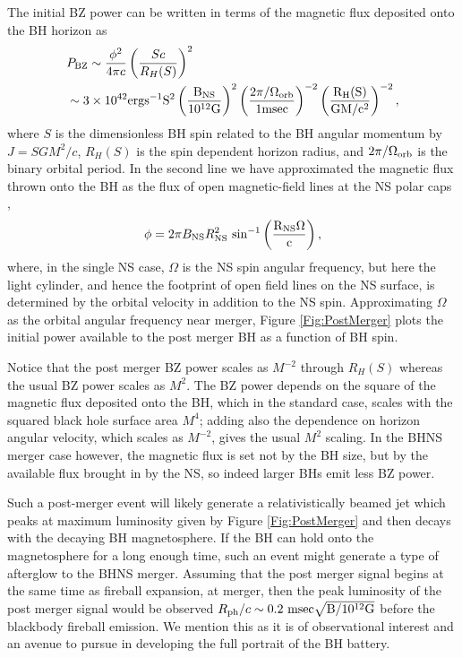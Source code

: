 The initial BZ power can be written in terms of the magnetic flux
deposited onto the BH horizon as
\begin{align}
  \label{Eq:PBZ}
&P_{\rm{BZ}} \sim \frac{\phi^2}{4 \pi c} \left(\frac{S
    c}{R_{H}(S)}\right)^2 \\ \nonumber 
%
&\sim 3 \times 10^{42}
  \rm{erg} \rm{s}^{-1} S^2 \left( \frac{B_{\rm{NS}} }{ 10^{12}
    G}\right)^2 \left( \frac{2 \pi / \Omega_{\rm{orb}} }{ 1 \rm{msec}}\right)^{-2}
  \left( \frac{R_H(S) }{ GM/c^2 }\right)^{-2} ,
\end{align}
where $S$ is the dimensionless BH spin related to the BH angular
momentum by $J = S GM^2/c$, $R_H(S)$ is the spin dependent horizon
radius, and $2 \pi / \Omega_{\rm{orb}}$ is the binary orbital period. In the second line we have approximated the magnetic flux
thrown onto the BH as the flux of open magnetic-field lines at the NS
polar caps \citep{GJ:1969, LyutikovMckinney:2011},
\begin{equation}
\phi = 2 \pi  B_{\rm NS} R^2_{\rm{NS}} \ \rm{sin}^{-1}\left(\frac{ R_{\rm{NS}} \Omega}{c}\right),
\end{equation}
where, in the single NS case, $\Omega$ is the NS spin angular
frequency, but here the light cylinder, and hence the footprint of
open field lines on the NS surface, is determined by the orbital
velocity in addition to the NS spin. Approximating $\Omega$ as the
orbital angular frequency near merger, Figure \ref{Fig:PostMerger}
plots the initial power available to the post merger BH as a function
of BH spin.


Notice that the post merger BZ power scales as $M^{-2}$ through
$R_H(S)$ whereas the usual BZ power scales as $M^2$. The BZ power
depends on the square of the magnetic flux deposited onto the BH,
which in the standard case, scales with the squared black hole surface area $M^4$; adding also the dependence on horizon
angular velocity, which scales as $M^{-2}$, gives the usual $M^2$
scaling. In the BHNS merger case however, the magnetic flux is set not
by the BH size, but by the available flux brought in by the NS, so
indeed larger BHs emit less BZ power.


Such a post-merger event will likely generate a relativistically
beamed jet which peaks at maximum luminosity given by Figure
\ref{Fig:PostMerger} and then decays with the decaying BH
magnetosphere. If the BH can hold onto the magnetosphere for a long
enough time, such an event might generate a type of afterglow to the
BHNS merger.  Assuming that the post merger signal begins at the same
time as fireball expansion, at merger, then the peak luminosity of the
post merger signal would be observed $R_{\rm{ph}}/c \sim 0.2
\ \rm{msec} \sqrt{B/10^{12}\rm{G}}$ before the blackbody fireball
emission. We mention this as it is of observational interest and an
avenue to pursue in developing the full portrait of the BH battery.




